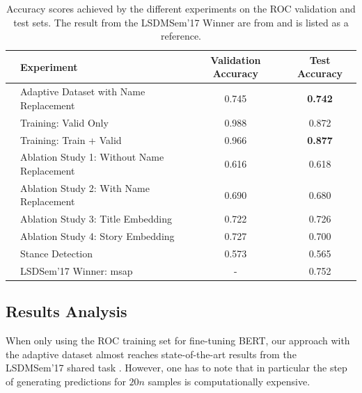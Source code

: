 \documentclass{article}
\newcommand\Tstrut{\rule{0pt}{2.1ex}}       %
\begin{document}
\begin{table}[h]
\centering
\vspace{-1mm}
\begin{tabular}{clcc}  
    \hline
     & Experiment    & Validation Accuracy & Test Accuracy \Tstrut \\
    \hline
    \parbox[t]{1mm}{} 
    & Adaptive Dataset with Name Replacement              & 0.745         & \textbf{0.742} \Tstrut  \\
    & Training: Valid Only                                & 0.988         & 0.872                   \\
    & Training: Train + Valid                             & 0.966         & \textbf{0.877}          \\
    & Ablation Study 1: Without Name Replacement          & 0.616         & 0.618                   \\
    & Ablation Study 2: With Name Replacement             & 0.690         & 0.680                   \\
    & Ablation Study 3: Title Embedding                   & 0.722         & 0.726                   \\
    & Ablation Study 4: Story Embedding                   & 0.727         & 0.700                   \\
    \hline
    \parbox[t]{2mm}{} 
    & Stance Detection                                    & 0.573         & 0.565      \Tstrut      \\
    & LSDSem'17 Winner: msap                              & -             & 0.752                   \\
    \hline
\end{tabular}
\vspace{1mm}
\caption{Accuracy scores achieved by the different experiments on the ROC validation and test sets. The result from the LSDMSem'17 Winner are from \cite{mostafazadeh-etal-2017-lsdsem} and is listed as a reference.}
\label{table_acuracy}
\end{table}

\subsection{Results Analysis}

When only using the ROC training set for fine-tuning BERT, our approach with the adaptive dataset almost reaches state-of-the-art results from the LSDMSem'17 shared task \cite{mostafazadeh-etal-2017-lsdsem}.
However, one has to note that in particular the step of generating predictions for $20n$ samples is computationally expensive.
\end{document}
